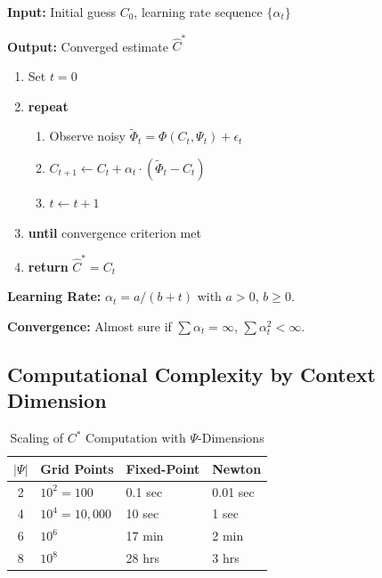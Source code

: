 \begin{tcolorbox}[colback=gray!5!white, colframe=gray!75!black,
    title=Algorithm AZ-C3: Robbins-Monro Stochastic Approximation]
\textbf{Input:} Initial guess $C_0$, learning rate sequence $\{\alpha_t\}$

\textbf{Output:} Converged estimate $\hat{C}^*$

\begin{enumerate}[nosep]
\item Set $t = 0$
\item \textbf{repeat}
    \begin{enumerate}[nosep]
    \item Observe noisy $\tilde{\Phi}_t = \Phi(C_t, \Psi_t) + \epsilon_t$
    \item $C_{t+1} \leftarrow C_t + \alpha_t \cdot (\tilde{\Phi}_t - C_t)$
    \item $t \leftarrow t + 1$
    \end{enumerate}
\item \textbf{until} convergence criterion met
\item \textbf{return} $\hat{C}^* = C_t$
\end{enumerate}

\textbf{Learning Rate:} $\alpha_t = a / (b + t)$ with $a > 0$, $b \geq 0$.

\textbf{Convergence:} Almost sure if $\sum \alpha_t = \infty$, $\sum \alpha_t^2 < \infty$.
\end{tcolorbox}

\subsection{Computational Complexity by Context Dimension}

\begin{table}[htbp]
\centering
\caption{Scaling of $C^*$ Computation with $\Psi$-Dimensions}
\label{tab:az-complexity}
\renewcommand{\arraystretch}{1.3}
\begin{tabular}{@{}clll@{}}
\toprule
\textbf{$|\Psi|$} & \textbf{Grid Points} & \textbf{Fixed-Point} & \textbf{Newton} \\
\midrule
2 & $10^2 = 100$ & 0.1 sec & 0.01 sec \\
4 & $10^4 = 10,000$ & 10 sec & 1 sec \\
6 & $10^6$ & 17 min & 2 min \\
8 & $10^8$ & 28 hrs & 3 hrs \\
\bottomrule
\end{tabular}
\end{table}


